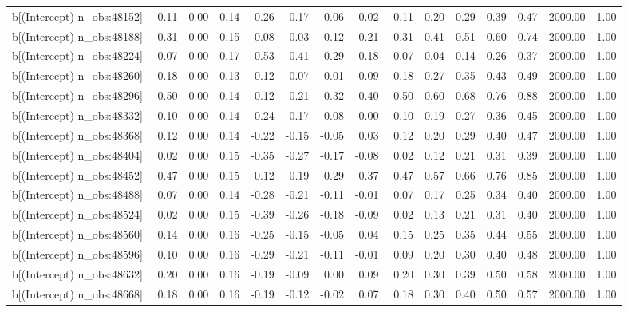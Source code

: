 \begin{table}[ht]
\begin{tabular}{rrrrrrrrrrrrrrr}
  b[(Intercept) n\_obs:48152] & 0.11 & 0.00 & 0.14 & -0.26 & -0.17 & -0.06 & 0.02 & 0.11 & 0.20 & 0.29 & 0.39 & 0.47 & 2000.00 & 1.00 \\ 
  b[(Intercept) n\_obs:48188] & 0.31 & 0.00 & 0.15 & -0.08 & 0.03 & 0.12 & 0.21 & 0.31 & 0.41 & 0.51 & 0.60 & 0.74 & 2000.00 & 1.00 \\ 
  b[(Intercept) n\_obs:48224] & -0.07 & 0.00 & 0.17 & -0.53 & -0.41 & -0.29 & -0.18 & -0.07 & 0.04 & 0.14 & 0.26 & 0.37 & 2000.00 & 1.00 \\ 
  b[(Intercept) n\_obs:48260] & 0.18 & 0.00 & 0.13 & -0.12 & -0.07 & 0.01 & 0.09 & 0.18 & 0.27 & 0.35 & 0.43 & 0.49 & 2000.00 & 1.00 \\ 
  b[(Intercept) n\_obs:48296] & 0.50 & 0.00 & 0.14 & 0.12 & 0.21 & 0.32 & 0.40 & 0.50 & 0.60 & 0.68 & 0.76 & 0.88 & 2000.00 & 1.00 \\ 
  b[(Intercept) n\_obs:48332] & 0.10 & 0.00 & 0.14 & -0.24 & -0.17 & -0.08 & 0.00 & 0.10 & 0.19 & 0.27 & 0.36 & 0.45 & 2000.00 & 1.00 \\ 
  b[(Intercept) n\_obs:48368] & 0.12 & 0.00 & 0.14 & -0.22 & -0.15 & -0.05 & 0.03 & 0.12 & 0.20 & 0.29 & 0.40 & 0.47 & 2000.00 & 1.00 \\ 
  b[(Intercept) n\_obs:48404] & 0.02 & 0.00 & 0.15 & -0.35 & -0.27 & -0.17 & -0.08 & 0.02 & 0.12 & 0.21 & 0.31 & 0.39 & 2000.00 & 1.00 \\ 
  b[(Intercept) n\_obs:48452] & 0.47 & 0.00 & 0.15 & 0.12 & 0.19 & 0.29 & 0.37 & 0.47 & 0.57 & 0.66 & 0.76 & 0.85 & 2000.00 & 1.00 \\ 
  b[(Intercept) n\_obs:48488] & 0.07 & 0.00 & 0.14 & -0.28 & -0.21 & -0.11 & -0.01 & 0.07 & 0.17 & 0.25 & 0.34 & 0.40 & 2000.00 & 1.00 \\ 
  b[(Intercept) n\_obs:48524] & 0.02 & 0.00 & 0.15 & -0.39 & -0.26 & -0.18 & -0.09 & 0.02 & 0.13 & 0.21 & 0.31 & 0.40 & 2000.00 & 1.00 \\ 
  b[(Intercept) n\_obs:48560] & 0.14 & 0.00 & 0.16 & -0.25 & -0.15 & -0.05 & 0.04 & 0.15 & 0.25 & 0.35 & 0.44 & 0.55 & 2000.00 & 1.00 \\ 
  b[(Intercept) n\_obs:48596] & 0.10 & 0.00 & 0.16 & -0.29 & -0.21 & -0.11 & -0.01 & 0.09 & 0.20 & 0.30 & 0.40 & 0.48 & 2000.00 & 1.00 \\ 
  b[(Intercept) n\_obs:48632] & 0.20 & 0.00 & 0.16 & -0.19 & -0.09 & 0.00 & 0.09 & 0.20 & 0.30 & 0.39 & 0.50 & 0.58 & 2000.00 & 1.00 \\ 
  b[(Intercept) n\_obs:48668] & 0.18 & 0.00 & 0.16 & -0.19 & -0.12 & -0.02 & 0.07 & 0.18 & 0.30 & 0.40 & 0.50 & 0.57 & 2000.00 & 1.00 \\ 

\end{tabular}
\end{table}
